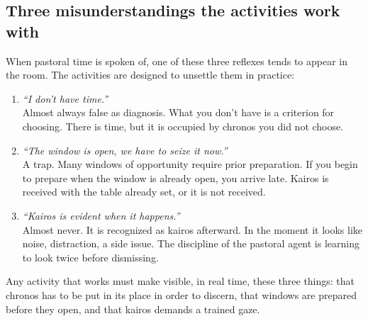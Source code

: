 \documentclass[11pt, a4paper]{article}
\begin{document}
\subsection*{Three misunderstandings the activities work with}

When pastoral time is spoken of, one of these three reflexes tends to appear in the room. The activities are designed to unsettle them in practice:

\begin{enumerate}[label={\color{tiempoAmbar}\arabic*.}]
  \item \emph{``I don't have time.''} \\
        Almost always false as diagnosis. What you don't have is a criterion for choosing. There is time, but it is occupied by chronos you did not choose.
  \item \emph{``The window is open, we have to seize it now.''} \\
        A trap. Many windows of opportunity require prior preparation. If you begin to prepare when the window is already open, you arrive late. Kairos is received with the table already set, or it is not received.
  \item \emph{``Kairos is evident when it happens.''} \\
        Almost never. It is recognized as kairos afterward. In the moment it looks like noise, distraction, a side issue. The discipline of the pastoral agent is learning to look twice before dismissing.
\end{enumerate}

Any activity that works must make visible, in real time, these three things: that chronos has to be put in its place in order to discern, that windows are prepared before they open, and that kairos demands a trained gaze.

\vspace{1.5em}
\end{document}
